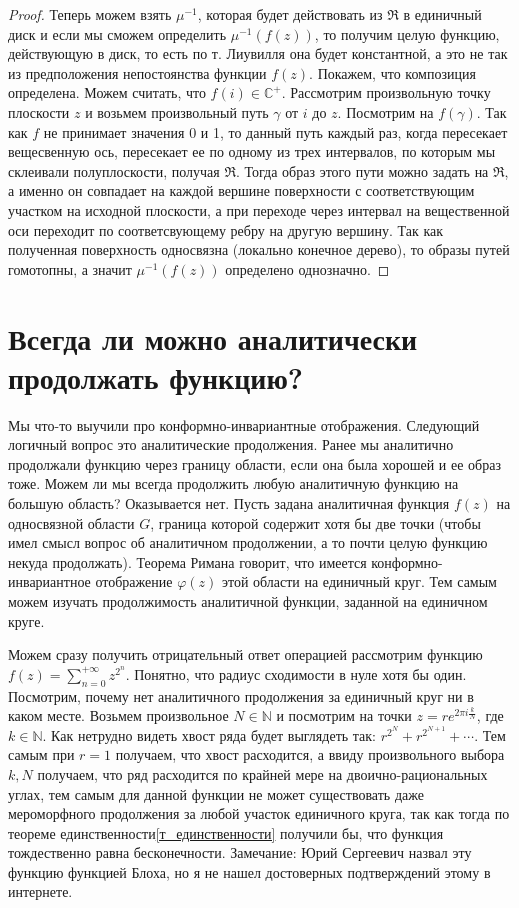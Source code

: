 \documentclass[12pt,a4paper]{article} %
\newcommand{\Co}{\mathbb{C}}
\begin{document}
\begin{proof}
		Теперь можем взять $\mu^{-1}$, которая будет действовать из $\mathfrak{R}$ в единичный диск и если мы сможем определить $\mu^{-1}(f(z))$, то получим целую функцию, действующую в диск, то есть по т. Лиувилля она будет константной, а это не так из предположения непостоянства функции $f(z)$. Покажем, что композиция определена. Можем считать, что $f(i)\in\Co^{+}$. Рассмотрим произвольную точку плоскости $z$ и возьмем произвольный путь $\gamma$ от $i$ до $z$. Посмотрим на $f(\gamma)$. Так как $f$ не принимает значения 0 и 1, то данный путь каждый раз, когда пересекает вещесвенную ось, пересекает ее по одному из трех интервалов, по которым мы склеивали полуплоскости, получая $\mathfrak{R}$. Тогда образ этого пути можно задать на $\mathfrak{R}$, а именно он совпадает на каждой вершине поверхности с соответствующим участком на исходной плоскости, а при переходе через интервал на вещественной оси переходит по соответсвующему ребру на другую вершину. Так как полученная поверхность односвязна (локально конечное дерево), то образы путей гомотопны, а значит $\mu^{-1}(f(z))$ определено однозначно.
	\end{proof}
	\section{Всегда ли можно аналитически продолжать функцию?}
	Мы что-то выучили про конформно-инвариантные отображения. Следующий логичный вопрос это аналитические продолжения. Ранее мы аналитично продолжали функцию через границу области, если она была хорошей и ее образ тоже. Можем ли мы всегда продолжить любую аналитичную функцию на большую область? Оказывается нет. Пусть задана аналитичная функция $f(z)$ на односвязной области $G$, граница которой содержит хотя бы две точки (чтобы имел смысл вопрос об аналитичном продолжении, а то почти целую функцию некуда продолжать). Теорема Римана говорит, что имеется конформно-инвариантное отображение $\varphi(z)$ этой области на единичный круг. Тем самым можем изучать продолжимость аналитичной функции, заданной на единичном круге.
	
	Можем сразу получить отрицательный ответ операцией рассмотрим функцию\\ $f(z)=\displaystyle\sum_{n=0}^{+\infty}z^{2^n}$. Понятно, что радиус сходимости в нуле хотя бы один. Посмотрим, почему нет аналитичного продолжения за единичный круг ни в каком месте. Возьмем произвольное $N\in\mathbb{N}$ и посмотрим на точки $z=re^{2\pi i\frac{k}{N}}$, где $k\in\mathbb{N}$. Как нетрудно видеть хвост ряда будет выглядеть так: $r^{2^N}+r^{2^{N+1}}+\cdots$. Тем самым при $r=1$ получаем, что хвост расходится, а ввиду произвольного выбора $k,N$ получаем, что ряд расходится по крайней мере на двоично-рациональных углах, тем самым для данной функции не может существовать даже мероморфного продолжения за любой участок единичного круга, так как тогда по теореме единственности\eqref{т_единственности} получили бы, что функция тождественно равна бесконечности. Замечание: Юрий Сергеевич назвал эту функцию функцией Блоха, но я не нашел достоверных подтверждений этому в интернете.
	
\end{document}
